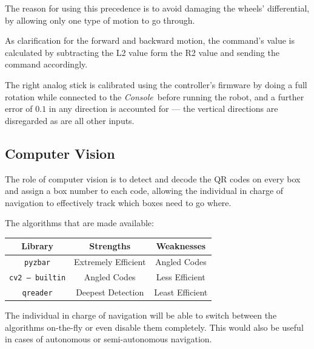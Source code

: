 \documentclass[a4paper,12pt]{article}
\newcommand{\con}{\textit{Console}}
\begin{document}
The reason for using this precedence is to avoid damaging the wheels' differential, by allowing only one type of motion to go through.

As clarification for the forward and backward motion, the command's value is calculated by subtracting the L2 value form the R2 value and sending the command accordingly.

The right analog stick is calibrated using the controller's firmware by doing a full rotation while connected to the \con\ before running the robot, and a further error of $0.1$ in any direction is accounted for --- the vertical directions are disregarded as are all other inputs.

\subsection{Computer Vision}
The role of computer vision is to detect and decode the QR codes on every box and assign a box number to each code, allowing the individual in charge of navigation to effectively track which boxes need to go where.

The algorithms that are made available:
\begin{center}
    \bgroup
    \def\arraystretch{1.5}
    {
        \begin{tabular}{|c|c|c|}
            \hline
            \textbf{Library}        & \textbf{Strengths}  & \textbf{Weaknesses} \\
            \hline
            \texttt{pyzbar}         & Extremely Efficient & Angled Codes        \\
            \hline
            \texttt{cv2 -- builtin} & Angled Codes        & Less Efficient      \\
            \hline
            \texttt{qreader}        & Deepest Detection   & Least Efficient     \\
            \hline
        \end{tabular}}
    \egroup
\end{center}
The individual in charge of navigation will be able to switch between the algorithms on-the-fly or even disable them completely. This would also be useful in cases of autonomous or semi-autonomous navigation.
\end{document}
